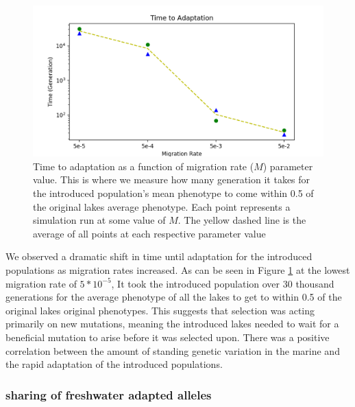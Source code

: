 \documentclass{article}
\begin{document}
\begin{figure}[h!tb]
	\begin{center}
  		\includegraphics[width=01.0\linewidth]{matplotlib/TimeToAdaptation.png}
  		\caption{Time to adaptation as a function of migration rate ($M$) parameter value. This is where we measure how many generation
		it takes for the introduced population's mean phenotype to come within 0.5 of the original lakes average phenotype. 
		Each point represents a simulation run at some value of $M$. 
		The yellow dashed line is the average of all points at each respective parameter value}
  		\label{fig:TimeToAdaptation}
	\end{center}
\end{figure}

We observed a dramatic shift in time until adaptation for the introduced populations
as migration rates increased. 
As can be seen in Figure \ref{fig:TimeToAdaptation} at the lowest migration rate of $5 * 10^{-5}$,
It took the introduced population over 30 thousand generations for the average phenotype of all the lakes to 
get to within 0.5 of the original lakes original phenotypes. 
This suggests that selection was acting primarily on new mutations, meaning the 
introduced lakes needed to wait for a beneficial mutation to arise before 
it was selected upon. 
There was a positive correlation between the amount of standing genetic variation in the 
marine and the rapid adaptation of the introduced populations.

 
\subsubsection*{sharing of freshwater adapted alleles}
\end{document}
